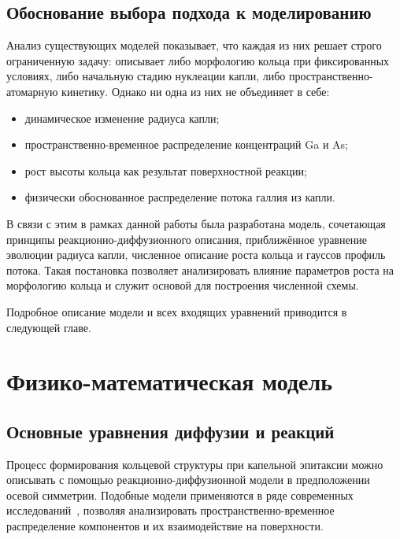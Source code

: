 \documentclass[14pt,oneside]{extarticle}
\begin{document}
\subsection{Обоснование выбора подхода к моделированию}

Анализ существующих моделей показывает, что каждая из них решает строго ограниченную задачу: описывает либо морфологию кольца при фиксированных условиях, либо начальную стадию нуклеации капли, либо пространственно-атомарную кинетику. Однако ни одна из них не объединяет в себе:

\begin{itemize}
  \item динамическое изменение радиуса капли;
  \item пространственно-временное распределение концентраций Ga и As;
  \item рост высоты кольца как результат поверхностной реакции;
  \item физически обоснованное распределение потока галлия из капли.
\end{itemize}

В связи с этим в рамках данной работы была разработана модель, сочетающая принципы реакционно-диффузионного описания, приближённое уравнение эволюции радиуса капли, численное описание роста кольца и гауссов профиль потока. Такая постановка позволяет анализировать влияние параметров роста на морфологию кольца и служит основой для построения численной схемы.

Подробное описание модели и всех входящих уравнений приводится в следующей главе.


\pagebreak

\section{Физико-математическая модель}

\subsection{Основные уравнения диффузии и реакций}

Процесс формирования кольцевой структуры при капельной эпитаксии можно описывать с помощью реакционно-диффузионной модели в предположении осевой симметрии. Подобные модели применяются в ряде современных исследований~\cite{reyes2013, bietti2020}, позволяя анализировать пространственно-временное распределение компонентов и их взаимодействие на поверхности.
\end{document}
